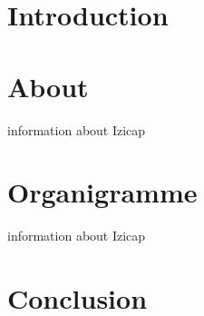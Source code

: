 
\section*{Introduction}

\section{About}
information about Izicap
\section{Organigramme}
information about Izicap

\section*{Conclusion}
